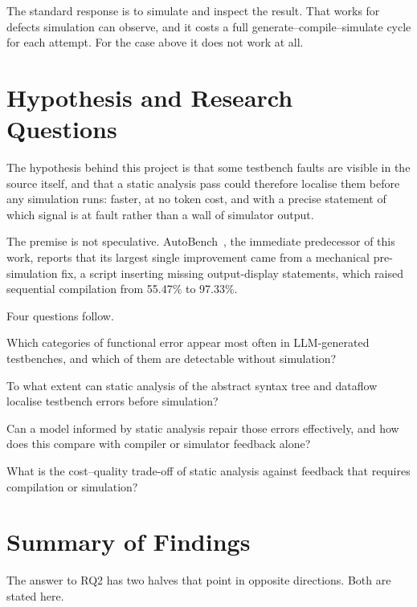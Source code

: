 \documentclass[11pt,a4paper,titlepage=false]{scrreprt}
\begin{document}
The standard response is to simulate and inspect the result. That works for defects
simulation can observe, and it costs a full generate--compile--simulate cycle for each
attempt. For the case above it does not work at all.

\section{Hypothesis and Research Questions}\label{sec:intro-rq}

The hypothesis behind this project is that some testbench faults are visible in the source
itself, and that a static analysis pass could therefore localise them before any simulation
runs: faster, at no token cost, and with a precise statement of which signal is at fault
rather than a wall of simulator output.

The premise is not speculative. AutoBench~\cite{qiu2024autobench}, the immediate predecessor
of this work, reports that its largest single improvement came from a mechanical
pre-simulation fix, a script inserting missing output-display statements, which raised
sequential compilation from 55.47\% to 97.33\%.

Four questions follow.

\begin{description}
\setlength{\itemsep}{1pt}
\item[\textnormal{\textbf{RQ1}}] Which categories of functional error appear most often in
LLM-generated testbenches, and which of them are detectable without simulation?
\item[\textnormal{\textbf{RQ2}}] To what extent can static analysis of the abstract syntax
tree and dataflow localise testbench errors before simulation?
\item[\textnormal{\textbf{RQ3}}] Can a model informed by static analysis repair those errors
effectively, and how does this compare with compiler or simulator feedback alone?
\item[\textnormal{\textbf{RQ4}}] What is the cost--quality trade-off of static analysis
against feedback that requires compilation or simulation?
\end{description}

\section{Summary of Findings}\label{sec:intro-findings}

The answer to RQ2 has two halves that point in opposite directions. Both are stated here.
\end{document}
